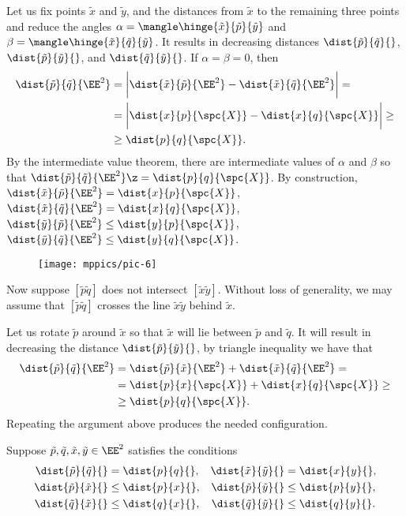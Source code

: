 Let us fix points $\tilde x$ and $\tilde y$, and the distances from $\tilde x$ to the remaining three points and reduce the angles $\alpha=\mangle\hinge{\tilde x}{\tilde p}{\tilde y}$ and $\beta=\mangle\hinge{\tilde x}{\tilde q}{\tilde y}$.
It results in decreasing distances $\dist{\tilde p}{\tilde q}{}$, $\dist{\tilde p}{\tilde y}{}$, and $\dist{\tilde q}{\tilde y}{}$.
If $\alpha=\beta=0$, then 
\begin{align*}
\dist{\tilde p}{\tilde q}{\EE^2}&=
\biggl|\dist{\tilde x}{\tilde p}{\EE^2}-\dist{\tilde x}{\tilde q}{\EE^2}\biggr|=
\\
&=\biggl|\dist{ x}{ p}{\spc{X}}-\dist{ x}{ q}{\spc{X}}\biggr|\ge
\\
&\ge\dist{p}{q}{\spc{X}}.
\end{align*}
By the intermediate value theorem, there are intermediate values of $\alpha$ and $\beta$ so that $\dist{\tilde p}{\tilde q}{\EE^2}\z=\dist{p}{q}{\spc{X}}$.
By construction, $\dist{\tilde x}{\tilde p}{\EE^2}=\dist{x}{p}{\spc{X}}$, $\dist{\tilde x}{\tilde q}{\EE^2}=\dist{x}{q}{\spc{X}}$, $\dist{\tilde y}{\tilde p}{\EE^2}\le\dist{y}{p}{\spc{X}}$, $\dist{\tilde y}{\tilde q}{\EE^2}\le\dist{y}{q}{\spc{X}}$.

\begin{wrapfigure}{o}{30 mm}
\vskip-0mm
\centering
\texttt{[image: mppics/pic-6]}
\end{wrapfigure}

Now suppose $[\tilde p \tilde q]$ does not intersect $[\tilde x\tilde y]$.
Without loss of generality, we may assume that $[\tilde p \tilde q]$ crosses the line $\tilde x\tilde y$ behind $\tilde x$.

Let us rotate $\tilde p$ around $\tilde x$ so that $\tilde x$ will lie between $\tilde p$ and $\tilde q$.
It will result in decreasing the distance $\dist{\tilde p}{\tilde y}{}$,
by triangle inequality we have that 
\begin{align*}
\dist{\tilde p}{\tilde q}{\EE^2}&=\dist{\tilde p}{\tilde x}{\EE^2}+\dist{\tilde x}{\tilde q}{\EE^2}=
\\
&=\dist{p}{x}{\spc{X}}+\dist{x}{q}{\spc{X}}\ge
\\
&\ge \dist{p}{q}{\spc{X}}.
\end{align*}
Repeating the argument above produces the needed configuration.

Suppose $\tilde p,\tilde q,\tilde x,\tilde y\in\EE^2$ satisfies the conditions 
\begin{align*}
\dist{\tilde p}{\tilde q}{}&=\dist{p}{q}{},
&
\dist{\tilde x}{\tilde y}{}&=\dist{x}{y}{},
\\
\dist{\tilde p}{\tilde x}{}&\le \dist{p}{x}{},
&
\dist{\tilde p}{\tilde y}{}&\le \dist{p}{y}{},
\\
\dist{\tilde q}{\tilde x}{}&\le \dist{q}{x}{},
&
\dist{\tilde q}{\tilde y}{}&\le \dist{q}{y}{}.
\end{align*}

